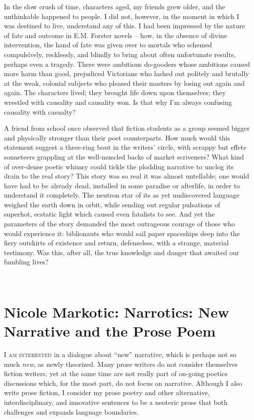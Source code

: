 \documentclass[
]{memoir}
\begin{document}
In the slow crush of time, characters aged, my friends grew older, and
the unthinkable happened to people. I did not, however, in the moment in
which I was destined to live, understand any of this. I had been
impressed by the nature of fate and outcome in E.M. Forster novels --
how, in the absence of divine intervention, the hand of fate was given
over to mortals who schemed compulsively, recklessly, and blindly to
bring about often unfortunate results, perhaps even a tragedy. There
were ambitious do-gooders whose ambitions caused more harm than good,
prejudiced Victorians who lashed out politely and brutally at the weak,
colonial subjects who pleased their masters by losing out again and
again. The characters lived; they brought life down upon themselves;
they wrestled with causality and causality won. Is that why I'm always
confusing causality with casualty?

A friend from school once observed that fiction students as a group
seemed bigger and physically stronger than their poet counterparts. How
much would this statement suggest a three-ring bout in the writers'
circle, with scrappy but effete sonneteers grappling at the well-muscled
backs of market scriveners? What kind of over-dense poetic whimsy could
tickle the plodding narrative to unclog its drain to the real story?
This story was so real it was almost untellable; one would have had to
be already dead, installed in some paradise or afterlife, in order to
understand it completely. The neutron star of its as yet undiscovered
language weighed the earth down in orbit, while sending out regular
pulsations of superhot, ecstatic light which caused even fatalists to
see. And yet the parameters of the story demanded the most outrageous
courage of those who would experience it: biblionauts who would sail
paper spaceships deep into the fiery outskirts of existence and return,
defenseless, with a strange, material testimony. Was this, after all,
the true knowledge and danger that awaited our fumbling lives?

~

\hypertarget{nicole-markotic-narrotics-new-narrative-and-the-prose-poem}{%
\chapter{Nicole Markotic: Narrotics: New Narrative and the Prose
Poem}\label{nicole-markotic-narrotics-new-narrative-and-the-prose-poem}}

\lettrine[lines=3, findent=0em, nindent=0.1em, lhang=0]{I}{ am interested}
in a dialogue about ``new'' narrative, which is perhaps not so much
\emph{new}, as newly theorized. Many prose writers do not consider
themselves fiction writers, yet at the same time are not really part of
on-going poetics discussions which, for the most part, do not focus on
narrative. Although I also write prose fiction, I consider my prose
poetry and other alternative, interdisciplinary, and innovative
sentences to be a neoteric prose that both challenges and expands
language boundaries.
\end{document}
